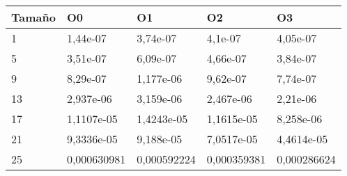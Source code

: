 \begin{tabular}{|l|l|l|l|l|}
	\hline
	Tamaño & O0 & O1 & O2 & O3 \\
	\hline
	\hline
	1 & 1,44e-07 & 3,74e-07 & 4,1e-07 & 4,05e-07 \\
	\hline
	5 & 3,51e-07 & 6,09e-07 & 4,66e-07 & 3,84e-07 \\
	\hline
	9 & 8,29e-07 & 1,177e-06 & 9,62e-07 & 7,74e-07 \\
	\hline
	13 & 2,937e-06 & 3,159e-06 & 2,467e-06 & 2,21e-06 \\
	\hline
	17 & 1,1107e-05 & 1,4243e-05 & 1,1615e-05 & 8,258e-06 \\
	\hline
	21 & 9,3336e-05 & 9,188e-05 & 7,0517e-05 & 4,4614e-05 \\
	\hline
	25 & 0,000630981 & 0,000592224 & 0,000359381 & 0,000286624 \\
	\hline
\end{tabular}
